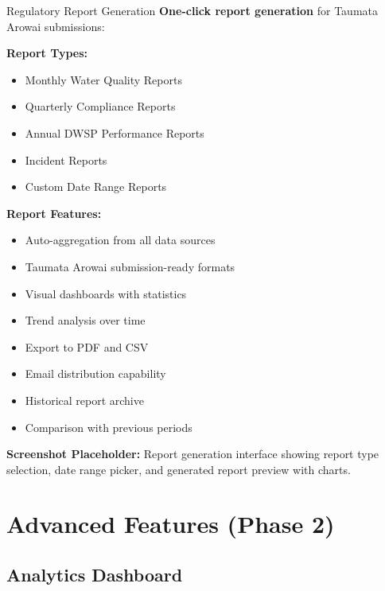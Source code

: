 \documentclass[11pt,a4paper]{article}
\begin{document}
\begin{featurebox}{Regulatory Report Generation}
    \textbf{One-click report generation} for Taumata Arowai submissions:

    \vspace{0.5cm}
    \textbf{Report Types:}
    \begin{itemize}[itemsep=0.2em]
        \item Monthly Water Quality Reports
        \item Quarterly Compliance Reports
        \item Annual DWSP Performance Reports
        \item Incident Reports
        \item Custom Date Range Reports
    \end{itemize}

    \vspace{0.5cm}
    \textbf{Report Features:}
    \begin{itemize}[itemsep=0.2em]
        \item Auto-aggregation from all data sources
        \item Taumata Arowai submission-ready formats
        \item Visual dashboards with statistics
        \item Trend analysis over time
        \item Export to PDF and CSV
        \item Email distribution capability
        \item Historical report archive
        \item Comparison with previous periods
    \end{itemize}
\end{featurebox}

\vspace{0.5cm}

\textbf{Screenshot Placeholder:} Report generation interface showing report type selection, date range picker, and generated report preview with charts.

\newpage

\section{Advanced Features (Phase 2)}

\subsection{Analytics Dashboard}
\end{document}
